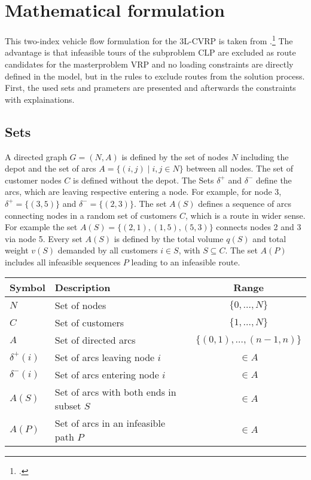 \section{Mathematical formulation}
\label{sec:mathematical_formulation}

This two-index vehicle flow formulation for the \gls{3L-CVRP} is taken from \cite{tamke_branch-and-cut_2024}.\footcite[cf.][pp. 6-7]{tamke_branch-and-cut_2024}
The advantage is that infeasible tours of the subproblem \gls{CLP} are excluded
as route candidates for the masterproblem \gls{VRP} and no loading constraints are directly defined in the model, but in the rules
to exclude routes from the solution process. First, the used sets and prameters are presented and afterwards the constraints with
explainations.

\subsection*{Sets}
A directed graph $G=(N,A)$ is defined by the set of nodes $N$ including the depot and the set of arcs
$A = \{ (i, j) \mid i, j \in N \}$ between all nodes. The set of customer nodes $C$ is defined without the depot.
The Sets $\delta^+$ and $\delta^-$ define the arcs, which are leaving respective entering a node.
For example, for node 3, $\delta^+ = \{(3,5)\}$ and $\delta^-= \{(2,3)\}$.
The set $A(S)$ defines a sequence of arcs connecting nodes in a random set of customers $C$,
which is a route in wider sense. For example the set $A(S)=\{(2,1),(1,5),(5,3)\}$ connects nodes
2 and 3 via node 5. Every set $A(S)$ is defined by the total volume $q(S)$ and total weight $v(S)$
demanded by all customers $i \in S$, with $S \subseteq C$. The set $A(P)$ includes all infeasible sequences $P$ leading
to an infeasible route.

\begin{table}[ht]
    \centering
    \begin{tabular}{llc}
        \toprule
        Symbol        & Description                              & Range                         \\
        \midrule
        $N$           & Set of nodes                             & $\{ 0, \dots, N \}$           \\
        $C$           & Set of customers                         & $\{ 1, \dots, N \} $          \\
        $A$           & Set of directed arcs                     & $\{(0,1), \dots, (n-1, n) \}$ \\
        $\delta^+(i)$ & Set of arcs leaving node $i$             & $\in A$                       \\
        $\delta^-(i)$ & Set of arcs entering node $i$            & $\in A$                       \\
        $A(S)$        & Set of arcs with both ends in subset $S$ & $\in A$                       \\
        $A(P)$        & Set of arcs in an infeasible path $P$    & $\in A$                       \\
        \bottomrule
    \end{tabular}
\end{table}
\vspace{0.2em}

